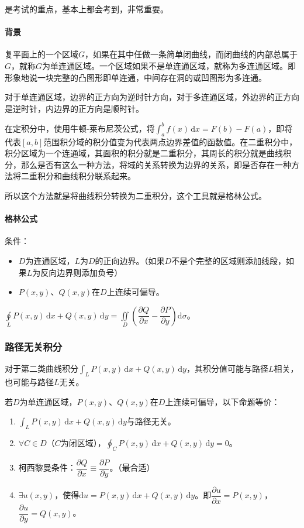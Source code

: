 是考试的重点，基本上都会考到，非常重要。

\paragraph{背景} \leavevmode \medskip

复平面上的一个区域$G$，如果在其中任做一条简单闭曲线，而闭曲线的内部总属于$G$，就称$G$为单连通区域。一个区域如果不是单连通区域，就称为多连通区域。即形象地说一块完整的凸图形即单连通，中间存在洞的或凹图形为多连通。

对于单连通区域，边界的正方向为逆时针方向，对于多连通区域，外边界的正方向是逆时针，内边界的正方向是顺时针。

在定积分中，使用牛顿-莱布尼茨公式，将$\int_a^bf(x)\,\textrm{d}x=F(b)-F(a)$，即将代表$[a,b]$范围积分域的积分值变为代表两点边界差值的函数值。在二重积分中，积分区域为一个连通域，其面积的积分就是二重积分，其周长的积分就是曲线积分，那么是否有这么一种方法，将域的关系转换为边界的关系，即是否存在一种方法将二重积分和曲线积分联系起来。

所以这个方法就是将曲线积分转换为二重积分，这个工具就是格林公式。

\paragraph{格林公式} \leavevmode \medskip

条件：

\begin{itemize}
    \item $D$为连通区域，$L$为$D$的正向边界。（如果$D$不是个完整的区域则添加线段，如果$L$为反向边界则添加负号）
    \item $P(x,y)$、$Q(x,y)$在$D$上连续可偏导。
\end{itemize}

$\displaystyle{\oint\limits_LP(x,y)\,\textrm{d}x+Q(x,y)\,\textrm{d}y=\iint\limits_D\left(\dfrac{\partial Q}{\partial x}-\dfrac{\partial P}{\partial y}\right)\textrm{d}\sigma}$。

\subsubsection{路径无关积分}

对于第二类曲线积分$\int_LP(x,y)\,\textrm{d}x+Q(x,y)\,\textrm{d}y$，其积分值可能与路径$L$相关，也可能与路径$L$无关。

若$D$为单连通区域，$P(x,y)$、$Q(x,y)$在$D$上连续可偏导，以下命题等价：

\begin{enumerate}
    \item $\int_LP(x,y)\,\textrm{d}x+Q(x,y)\,\textrm{d}y$与路径无关。
    \item $\forall C\in D$（$C$为闭区域），$\oint_CP(x,y)\,\textrm{d}x+Q(x,y)\,\textrm{d}y=0$。
    \item 柯西黎曼条件：$\dfrac{\partial Q}{\partial x}\equiv\dfrac{\partial P}{\partial y}$。（最合适）
    \item $\exists u(x,y)$，使得$\textrm{d}u=P(x,y)\,\textrm{d}x+Q(x,y)\,\textrm{d}y$。即$\dfrac{\partial u}{\partial x}=P(x,y)$，$\dfrac{\partial u}{\partial y}=Q(x,y)$。
\end{enumerate}

